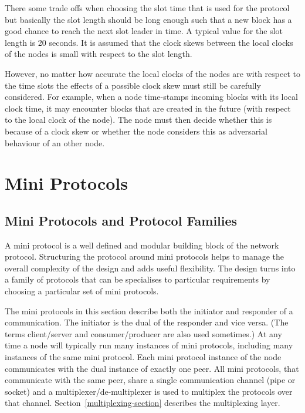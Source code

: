 \documentclass{report}
\newcommand{\wip}[1]{\color{magenta}{#1}\color{black}}
\theoremstyle{definition}{
  \newtheorem{lemma}{Lemma}[section] %
  \newtheorem{definition}[lemma]{Definition}
}
\theoremstyle{theorem}{
  \newtheorem{invariant}[lemma]{Invariant}
  \newtheorem{proofobligation}[lemma]{Proof Obligation}
}
\numberwithin{equation}{lemma}
\begin{document}
There some trade offs when choosing the slot time that is used for the protocol but
basically the slot length should be long enough such that a new block has a good chance to reach the
next slot leader in time.
A typical value for the slot length is 20 seconds.
It is assumed that the clock skews between the local clocks of the nodes is small with respect to the
slot length.

However, no matter how accurate the local clocks of the nodes are with respect to the time slots
the effects of a possible clock skew must still be carefully considered.
For example, when a node time-stamps incoming blocks with its local clock time, it may encounter
blocks that are created in the future
(with respect to the local clock of the node).
The node must then decide whether this is because of a clock skew or whether the node considers this
as adversarial behaviour of an other node.

\wip{TODO :: get feedback from the researchers on this. Tentative policy: allow 200ms to 1s
explain the problem in detail.
a node cannot forward a block from the future.
This is complicated !
}

\chapter{Mini Protocols}
\label{state-machine-section}

\section{Mini Protocols and Protocol Families}
A mini protocol is a well defined and modular building block of
the network protocol.
Structuring the protocol around mini protocols helps to manage the overall complexity of
the design and adds useful flexibility.
The design turns into a family of protocols that can be specialises to particular requirements
by choosing a particular set of mini protocols.

The mini protocols in this section describe both the initiator and responder of a communication.
The initiator is the dual of the responder and vice versa.
(The terms client/server and consumer/producer are also used sometimes.)
At any time a node will typically run many instances of mini protocols, including many instances of the
same mini protocol.
Each mini protocol instance of the node communicates with the dual
instance of exactly one peer.
All mini protocols, that communicate with the same peer,
share a single communication channel (pipe or socket)
and a multiplexer/de-multiplexer is used to multiplex the protocols over that channel.
Section~\ref{multiplexing-section} describes the multiplexing layer.
\end{document}
